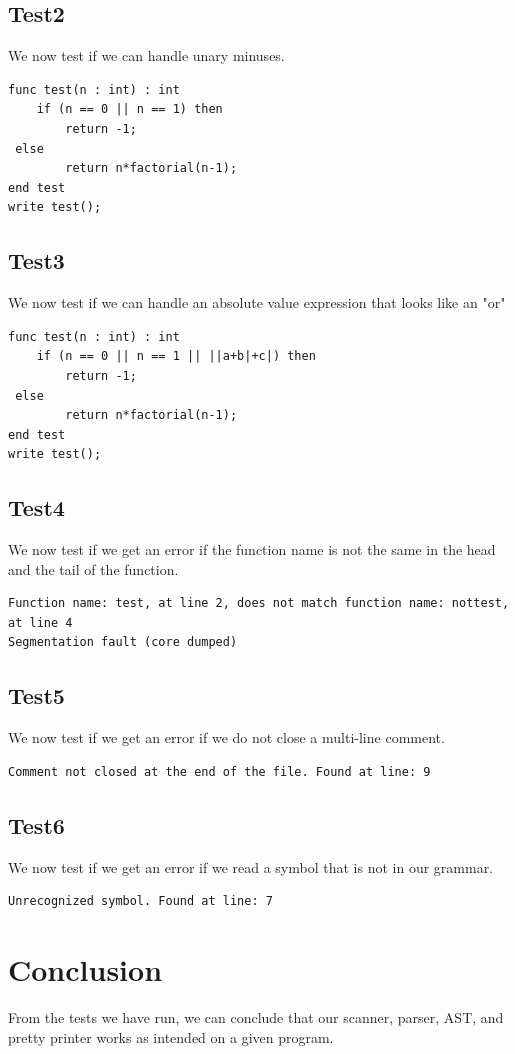 \documentclass[a4paper,10pt,titlepage]{report}
\begin{document}
\subsection{Test2}
We now test if we can handle unary minuses.
\begin{lstlisting}
func test(n : int) : int
    if (n == 0 || n == 1) then
        return -1;
 else
        return n*factorial(n-1);
end test
write test();
\end{lstlisting}

\subsection{Test3}
We now test if we can handle an absolute value expression that looks like an "or" 
\begin{lstlisting}
func test(n : int) : int
    if (n == 0 || n == 1 || ||a+b|+c|) then
        return -1;
 else
        return n*factorial(n-1);
end test
write test();
\end{lstlisting}

\subsection{Test4}
We now test if we get an error if the function name is not the same in the head and the tail of the function.
\begin{lstlisting}
Function name: test, at line 2, does not match function name: nottest, at line 4
Segmentation fault (core dumped)
\end{lstlisting}

\subsection{Test5}
We now test if we get an error if we do not close a multi-line comment.
\begin{lstlisting}
Comment not closed at the end of the file. Found at line: 9
\end{lstlisting}

\subsection{Test6}
We now test if we get an error if we read a symbol that is not in our grammar.
\begin{lstlisting}
Unrecognized symbol. Found at line: 7
\end{lstlisting}
\section{Conclusion}
From the tests we have run, we can conclude that our scanner, parser, AST, and pretty printer works as intended on a given program. 
\end{document}
